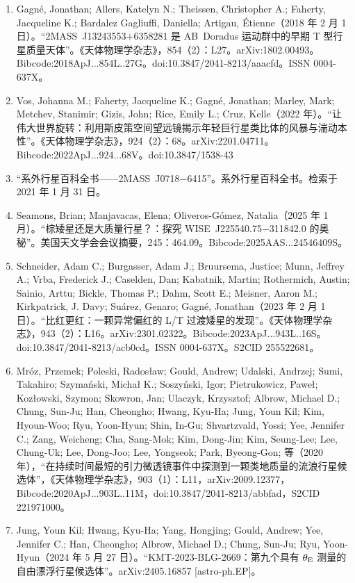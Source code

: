 \begin{enumerate}
\item Gagné, Jonathan; Allers, Katelyn N.; Theissen, Christopher A.; Faherty, Jacqueline K.; Bardalez Gagliuffi, Daniella; Artigau, Étienne（2018 年 2 月 1 日）。“2MASS~J13243553+6358281 是 AB~Doradus 运动群中的早期 T 型行星质量天体”。《天体物理学杂志》，854（2）：L27。arXiv:1802.00493。Bibcode:2018ApJ...854L..27G。doi:10.3847/2041-8213/aaacfd。ISSN 0004-637X。  
\item Vos, Johanna M.; Faherty, Jacqueline K.; Gagné, Jonathan; Marley, Mark; Metchev, Stanimir; Gizis, John; Rice, Emily L.; Cruz, Kelle（2022 年）。“让伟大世界旋转：利用斯皮策空间望远镜揭示年轻巨行星类比体的风暴与湍动本性”。《天体物理学杂志》，924（2）：68。arXiv:2201.04711。Bibcode:2022ApJ...924...68V。doi:10.3847/1538-43
\item “系外行星百科全书——2MASS~J0718$-$6415”。系外行星百科全书。检索于 2021 年 1 月 31 日。  
\item Seamons, Brian; Manjavacas, Elena; Oliveros-Gómez, Natalia（2025 年 1 月）。“棕矮星还是大质量行星？：探究 WISE~J225540.75$-$311842.0 的奥秘”。美国天文学会会议摘要，245：464.09。Bibcode:2025AAS...24546409S。  
\item Schneider, Adam C.; Burgasser, Adam J.; Bruursema, Justice; Munn, Jeffrey A.; Vrba, Frederick J.; Caselden, Dan; Kabatnik, Martin; Rothermich, Austin; Sainio, Arttu; Bickle, Thomas P.; Dahm, Scott E.; Meisner, Aaron M.; Kirkpatrick, J. Davy; Suárez, Genaro; Gagné, Jonathan（2023 年 2 月 1 日）。“比红更红：一颗异常偏红的 L/T 过渡矮星的发现”。《天体物理学杂志》，943（2）：L16。arXiv:2301.02322。Bibcode:2023ApJ...943L..16S。doi:10.3847/2041-8213/acb0cd。ISSN 0004-637X。S2CID 255522681。
\item Mróz, Przemek; Poleski, Radosław; Gould, Andrew; Udalski, Andrzej; Sumi, Takahiro; Szymański, Michał K.; Soszyński, Igor; Pietrukowicz, Paweł; Kozłowski, Szymon; Skowron, Jan; Ulaczyk, Krzysztof; Albrow, Michael D.; Chung, Sun-Ju; Han, Cheongho; Hwang, Kyu-Ha; Jung, Youn Kil; Kim, Hyoun-Woo; Ryu, Yoon-Hyun; Shin, In-Gu; Shvartzvald, Yossi; Yee, Jennifer C.; Zang, Weicheng; Cha, Sang-Mok; Kim, Dong-Jin; Kim, Seung-Lee; Lee, Chung-Uk; Lee, Dong-Joo; Lee, Yongseok; Park, Byeong-Gon; 等（2020 年），“在持续时间最短的引力微透镜事件中探测到一颗类地质量的流浪行星候选体”，《天体物理学杂志》，903（1）：L11，arXiv:2009.12377，Bibcode:2020ApJ...903L..11M，doi:10.3847/2041-8213/abbfad，S2CID 221971000。  
\item Jung, Youn Kil; Hwang, Kyu-Ha; Yang, Hongjing; Gould, Andrew; Yee, Jennifer C.; Han, Cheongho; Albrow, Michael D.; Chung, Sun-Ju; Ryu, Yoon-Hyun（2024 年 5 月 27 日）。“KMT-2023-BLG-2669：第九个具有 $\theta_{\rm E}$ 测量的自由漂浮行星候选体”。arXiv:2405.16857 [astro-ph.EP]。  

\end{enumerate}

